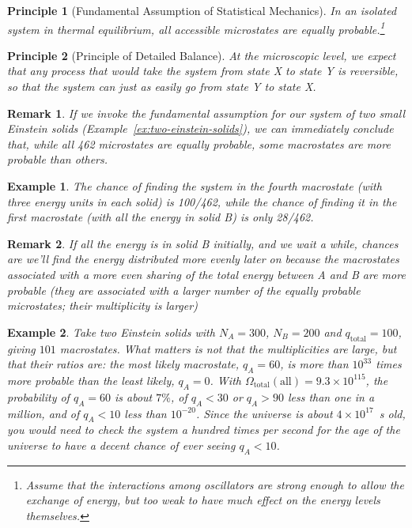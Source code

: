 \documentclass{article}
\newtheorem{principle}{Principle}
\newtheorem{example}{Example}
\newtheorem{remark}{Remark}
\begin{document}
\begin{principle}[Fundamental Assumption of Statistical Mechanics]
    In an isolated system in thermal equilibrium, all accessible microstates are equally probable.\footnote{Assume that the interactions among oscillators are strong enough to allow the exchange of energy, but too weak to have much effect on the energy levels themselves.}
\end{principle}
\begin{principle}[Principle of Detailed Balance]
    At the microscopic level, we expect that any process that would take the system from state X to state Y is reversible, so that the system can just as easily go from state Y to state X.
\end{principle}
\begin{remark}
    If we invoke the fundamental assumption for our system of two small Einstein solids (Example~\ref{ex:two-einstein-solids}), we can immediately conclude that, while all 462 microstates are equally probable, some macrostates are more probable than others.
\end{remark}
\begin{example}
    The chance of finding the system in the fourth macrostate (with three energy units in each solid) is 100/462, while the chance of finding it in the first macrostate (with all the energy in solid B) is only 28/462.
\end{example}
\begin{remark}
    If all the energy is in solid B initially, and we wait a
    while, chances are we'll find the energy distributed more evenly later on because the macrostates associated with a more even sharing of the total energy between A and B are more probable (they are associated with a larger number of the equally probable microstates; their multiplicity is larger)
\end{remark}
\begin{example}
    \label{ex:large-macrostates}
    Take two Einstein solids with $N_A = 300$, $N_B = 200$ and $q_{\text{total}} = 100$, giving $101$ macrostates. What matters is not that the multiplicities are large, but that their ratios are: the most likely macrostate, $q_A = 60$, is more than $10^{33}$ times more probable than the least likely, $q_A = 0$. With $\Omega_{\text{total}}(\text{all}) = 9.3 \times 10^{115}$, the probability of $q_A = 60$ is about $7\%$, of $q_A < 30$ or $q_A > 90$ less than one in a million, and of $q_A < 10$ less than $10^{-20}$. Since the universe is about $4 \times 10^{17}$~s old, you would need to check the system a hundred times per second for the age of the universe to have a decent chance of ever seeing $q_A < 10$.
\end{example}
\end{document}
